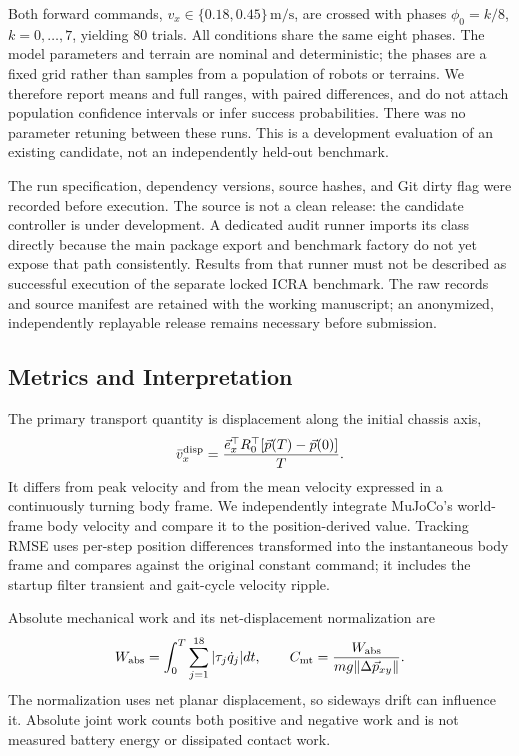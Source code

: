 \documentclass[letterpaper,10pt,conference]{ieeeconf}
\newcommand{\vct}[1]{\vec{#1}}
\begin{document}
Both forward commands, $v_x\in\{0.18,0.45\}\,\mathrm{m/s}$, are crossed with phases $\phi_0=k/8$, $k=0,\ldots,7$, yielding 80 trials. All conditions share the same eight phases. The model parameters and terrain are nominal and deterministic; the phases are a fixed grid rather than samples from a population of robots or terrains. We therefore report means and full ranges, with paired differences, and do not attach population confidence intervals or infer success probabilities. There was no parameter retuning between these runs. This is a development evaluation of an existing candidate, not an independently held-out benchmark.

The run specification, dependency versions, source hashes, and Git dirty flag were recorded before execution. The source is not a clean release: the candidate controller is under development. A dedicated audit runner imports its class directly because the main package export and benchmark factory do not yet expose that path consistently. Results from that runner must not be described as successful execution of the separate locked ICRA benchmark. The raw records and source manifest are retained with the working manuscript; an anonymized, independently replayable release remains necessary before submission.

\subsection{Metrics and Interpretation}
The primary transport quantity is displacement along the initial chassis axis,
\begin{equation}
 \bar v_x^{\rm disp}=\frac{\vct{e}_x^\top R_0^\top[\vct{p}(T)-\vct{p}(0)]}{T}.
\end{equation}
It differs from peak velocity and from the mean velocity expressed in a continuously turning body frame. We independently integrate MuJoCo's world-frame body velocity and compare it to the position-derived value. Tracking RMSE uses per-step position differences transformed into the instantaneous body frame and compares against the original constant command; it includes the startup filter transient and gait-cycle velocity ripple.

Absolute mechanical work and its net-displacement normalization are
\begin{equation}
 W_{\rm abs}=\int_0^T\sum_{j=1}^{18}|\tau_j\dot q_j|dt,\qquad
 C_{\rm mt}=\frac{W_{\rm abs}}{mg\|\Delta\vct{p}_{xy}\|}.
\end{equation}
The normalization uses net planar displacement, so sideways drift can influence it. Absolute joint work counts both positive and negative work and is not measured battery energy or dissipated contact work.
\end{document}
